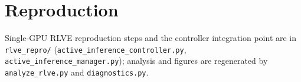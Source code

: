 \documentclass{article}
\begin{document}
\section{Reproduction}
Single-GPU RLVE reproduction steps and the controller integration point are in
\texttt{rlve\_repro/} (\texttt{active\_inference\_controller.py},
\texttt{active\_inference\_manager.py}); analysis and figures are regenerated by
\texttt{analyze\_rlve.py} and \texttt{diagnostics.py}.
\end{document}
